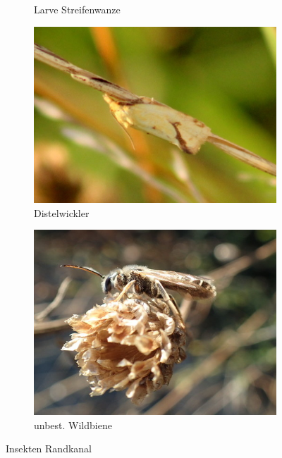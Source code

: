 \documentclass[10pt]{article}
\begin{document}
\begin{figure}[h!]
\begin{subfigure}[b]{0.44\linewidth}
    \caption{Larve Streifenwanze}
  \end{subfigure}
  \begin{subfigure}[b]{0.45\linewidth}
    \includegraphics[width=\linewidth]{img/randkanal/distelwickler.jpg}
    \caption{Distelwickler}
  \end{subfigure}
  \begin{subfigure}[b]{0.43\linewidth}
    \includegraphics[width=\linewidth]{img/randkanal/wildbiene.jpg}
    \caption{unbest. Wildbiene}
  \end{subfigure}
  \caption{Insekten Randkanal}
\end{figure}

\clearpage
\end{document}

